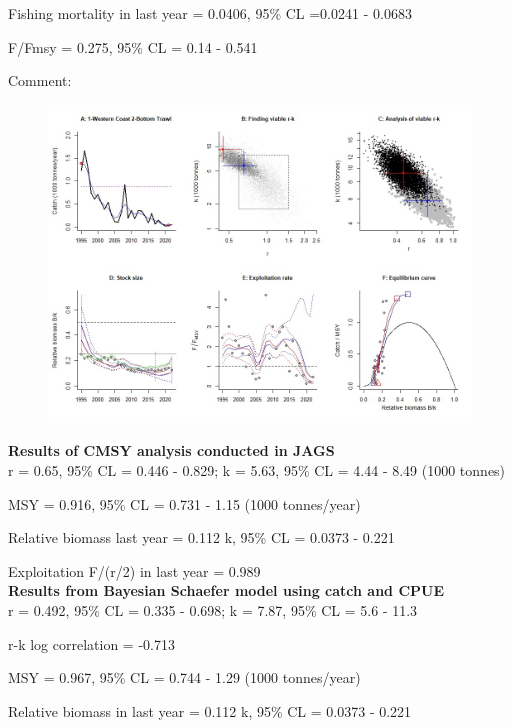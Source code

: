 \documentclass[12pt,a4paper]{article}\usepackage[]{graphicx}\usepackage[]{xcolor}
\begin{document}
Fishing mortality in last year = 0.0406, 95\% CL =0.0241 - 0.0683

F/Fmsy  = 0.275, 95\% CL = 0.14 - 0.541 

 Comment:  

    \pagebreak

    \begin{figure}[ht]
    \centering
    \includegraphics[width=1.00\textwidth ext=.jpg type=jpg]{1-Western Coast 2-Bottom Trawl_AN.jpg}
    \end{figure}

    \textbf{Results of CMSY analysis conducted in JAGS}\\

r = 0.65, 95\% CL = 0.446 - 0.829; k = 5.63, 95\% CL = 4.44 - 8.49 (1000 tonnes)

MSY = 0.916, 95\% CL = 0.731 - 1.15 (1000 tonnes/year)

Relative biomass last year = 0.112 k, 95\% CL = 0.0373 - 0.221

Exploitation F/(r/2) in last year = 0.989 \\

\textbf{Results from Bayesian Schaefer model using catch and CPUE}\\

r = 0.492, 95\% CL = 0.335 - 0.698; k = 7.87, 95\% CL = 5.6 - 11.3

r-k log correlation = -0.713

MSY = 0.967, 95\% CL = 0.744 - 1.29 (1000 tonnes/year)

Relative biomass in last year = 0.112 k, 95\% CL = 0.0373 - 0.221
\end{document}
